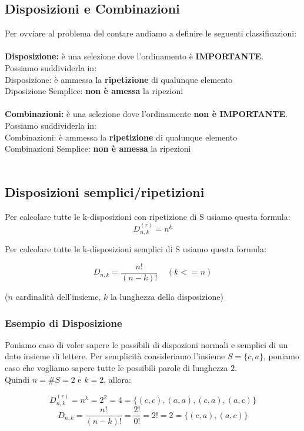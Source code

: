 \subsection{Disposizioni e Combinazioni}
Per ovviare al problema del contare andiamo a definire le seguenti classificazioni:\\\\
\textbf{Disposizione:} è una selezione dove l'ordinamento è \textbf{IMPORTANTE}.\\
Possiamo suddividerla in:\\
Disposizione: è ammessa la \textbf{ripetizione} di qualunque elemento\\
Diposizione Semplice: \textbf{non è amessa} la ripezioni\\\\
\textbf{Combinazioni: } è una selezione dove l'ordinamente \textbf{non è IMPORTANTE}.\\
Possiamo suddividerla in:\\
Combinazioni: è ammessa la \textbf{ripetizione} di qualunque elemento\\
Combinazioni Semplice: \textbf{non è amessa} la ripezioni\\\\

\subsection{Disposizioni semplici/ripetizioni}
\label{sec:disposizioni}
Per calcolare tutte le k-disposizioni con ripetizione di S usiamo questa formula:
$$ D^{(r)}_{n,k} = n^k$$ 

Per calcolare tutte le k-disposizioni semplici di S usiamo questa formula:

$$ D_{n,k} = \frac{n!}{(n-k)!} \: \: \: \: \: (k<=n)$$ 

\begin{center}
($n$ cardinalità dell'insieme, $k$ la lunghezza della disposizione)
\end{center}

\subsubsection{Esempio di Disposizione}
Poniamo caso di voler sapere le possibili di dispozioni normali e semplici di un dato insieme di lettere.
Per semplicità consideriamo l'insieme $S=\{c,a\}$, poniamo caso che vogliamo sapere tutte le possibili parole di lunghezza $2$.\\
Quindi $n = \#S = 2$ e $k = 2$, allora:

$$ D^{(r)}_{n,k} = n^k = 2^2 = 4 = \{(c,c),(a,a),(c,a),(a,c)\} $$
$$ D_{n,k} = \frac{n!}{(n-k)!} = \frac{2!}{0!} = 2! = 2 = \{(c,a), (a,c)\}$$ 
\fi